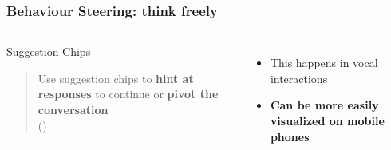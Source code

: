 \documentclass{beamer}
\begin{document}
\begin{frame}[allowframebreaks]
\frametitle{Behaviour Steering: think freely}

	\begin{columns}
			\begin{block}{Suggestion Chips}
		 		\begin{quote}
		 			Use suggestion chips to \textbf{hint at responses} to continue or \textbf{pivot the conversation}\\(\cite{googleactions})
		 		\end{quote}
		 			
	 		\end{block}
 		\medskip
 		
 		\begin{itemize}
	 		\item This happens in vocal interactions
	 		\item \textbf{Can be more easily visualized on mobile phones}
	 	\end{itemize}
 	

\end{columns}
\end{frame}
\end{document}

